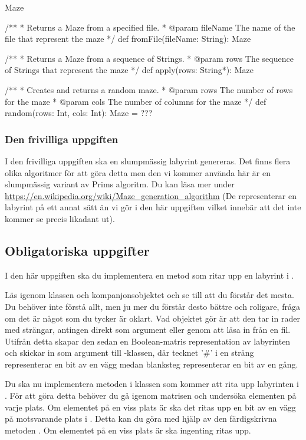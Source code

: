 \begin{ScalaSpec}{Maze}
{  /**
   *  Returns a Maze from a specified file.
   *  @param fileName	   The name of the file that represent the maze
   */
  def fromFile(fileName: String): Maze

  /**
   *  Returns a Maze from a sequence of Strings.
   *  @param rows	The sequence of Strings that represent the maze
   */
  def apply(rows: String*): Maze

  /**
   *  Creates and returns a random maze.
   *  @param rows		The number of rows for the maze
   *  @param cols		The number of columns for the maze
   */
  def random(rows: Int, cols: Int): Maze = ???

}

\end{ScalaSpec}

\subsubsection{Den frivilliga uppgiften}

I den frivilliga uppgiften ska en slumpmässig labyrint genereras. Det finns flera olika algoritmer för att göra detta men den vi kommer använda här är en slumpmässig variant av Prims algoritm. Du kan läsa mer under \url{https://en.wikipedia.org/wiki/Maze\_generation\_algorithm} (De representerar en labyrint på ett annat sätt än vi gör i den här uppgiften vilket innebär att det inte kommer se precis likadant ut).


\subsection{Obligatoriska uppgifter}

\Task I den här uppgiften ska du implementera en metod som ritar upp en labyrint i .

\Subtask Läs igenom klassen och kompanjonsobjektet  och se till att du förstår det mesta. Du behöver inte förstå allt, men ju mer du förstår desto bättre och roligare, fråga om det är något som du tycker är oklart. Vad objektet  gör är att den tar in rader med strängar, antingen direkt som argument eller genom att läsa in från en fil. Utifrån detta skapar den sedan en Boolean-matris representation av labyrinten och skickar in som argument till -klassen, där tecknet '\#' i en sträng representerar en bit av en vägg medan blanksteg representerar en bit av en gång.

\Subtask Du ska nu implementera metoden  i klassen  som kommer att rita upp labyrinten i . För att göra detta behöver du gå igenom matrisen  och undersöka elementen på varje plats. Om elementet på en viss plats är  ska det ritas upp en bit av en vägg på motsvarande plats i . Detta kan du göra med hjälp av den färdigskrivna metoden . Om elementet på en viss plats är  ska ingenting ritas upp.


